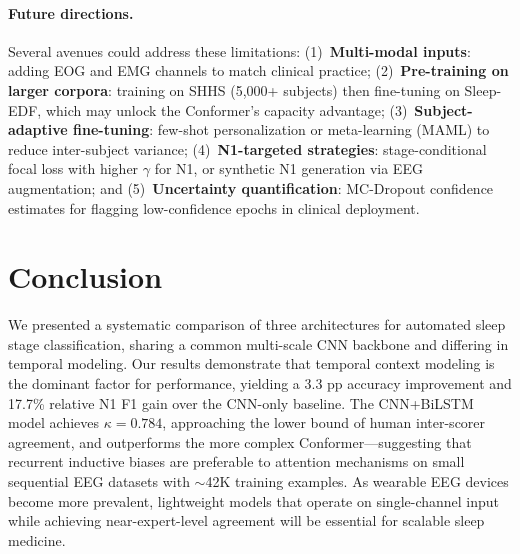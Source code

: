 \documentclass[final]{article}
\begin{document}
\paragraph{Future directions.}
Several avenues could address these limitations: (1)~\textbf{Multi-modal inputs}: adding EOG and EMG channels to match clinical practice; (2)~\textbf{Pre-training on larger corpora}: training on SHHS (5,000+ subjects) then fine-tuning on Sleep-EDF, which may unlock the Conformer's capacity advantage; (3)~\textbf{Subject-adaptive fine-tuning}: few-shot personalization or meta-learning (MAML) to reduce inter-subject variance; (4)~\textbf{N1-targeted strategies}: stage-conditional focal loss with higher $\gamma$ for N1, or synthetic N1 generation via EEG augmentation; and (5)~\textbf{Uncertainty quantification}: MC-Dropout confidence estimates for flagging low-confidence epochs in clinical deployment.

\section{Conclusion}

We presented a systematic comparison of three architectures for automated sleep stage classification, sharing a common multi-scale CNN backbone and differing in temporal modeling. Our results demonstrate that temporal context modeling is the dominant factor for performance, yielding a 3.3 pp accuracy improvement and 17.7\% relative N1 F1 gain over the CNN-only baseline. The CNN+BiLSTM model achieves $\kappa = 0.784$, approaching the lower bound of human inter-scorer agreement, and outperforms the more complex Conformer---suggesting that recurrent inductive biases are preferable to attention mechanisms on small sequential EEG datasets with $\sim$42K training examples. As wearable EEG devices become more prevalent, lightweight models that operate on single-channel input while achieving near-expert-level agreement will be essential for scalable sleep medicine.



\end{document}
